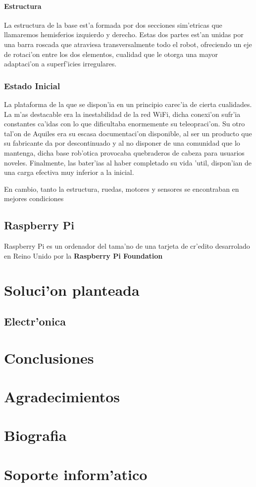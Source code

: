 \documentclass[twoside]{article}
\begin{document}
\paragraph{Estructura}\noindent

La estructura de la base est'a formada por dos secciones sim'etricas que llamaremos hemisferios izquierdo y derecho. Estas dos partes est'an unidas por una barra roscada que atraviesa transversalmente todo el robot, ofreciendo un eje de rotaci'on entre los dos elementos, cualidad que le otorga una mayor adaptaci'on a superf'icies irregulares.

\subsubsection{Estado Inicial}  
La plataforma de la que se dispon'ia en un principio carec'ia de cierta cualidades. La m'as destacable era la inestabilidad de la red WiFi, dicha conexi'on sufr'ia constantes ca'idas con lo que dificultaba enormemente su teleopraci'on. Su otro tal'on de Aquiles era su escasa documentaci'on disponible, al ser un producto que su fabricante da por descontinuado y al no disponer de una comunidad que lo mantenga, dicha base rob'otica provocaba quebraderos de cabeza para usuarios noveles. Finalmente, las bater'ias al haber completado su vida 'util, dispon'ian de una carga efectiva muy inferior a la inicial.

En cambio, tanto la estructura, ruedas, motores y sensores se encontraban en mejores condiciones

\subsection{Raspberry Pi}
Raspberry Pi es un ordenador del tama'no de una tarjeta de cr'edito desarrolado en Reino Unido por la \textbf{Raspberry Pi Foundation}
\newpage

\section{Soluci'on planteada}

\subsection{Electr'onica}
\newpage

\section{Conclusiones}
\newpage

\section{Agradecimientos}
\newpage

\section{Biografia}
\newpage

\section{Soporte inform'atico}
\end{document}
